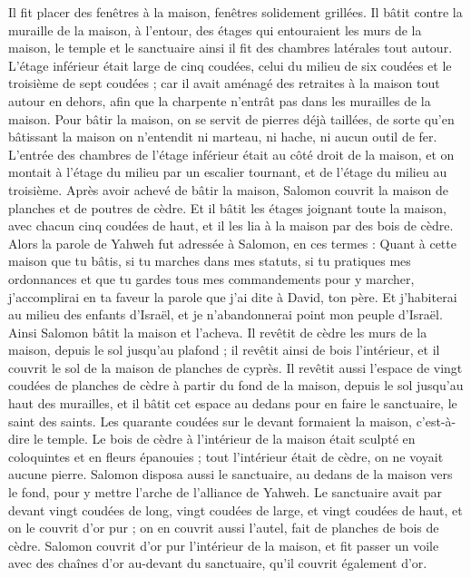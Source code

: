\begin{multicols}{2}
Il fit placer des fenêtres à la maison, fenêtres solidement grillées.
Il bâtit contre la muraille de la maison, à l’entour, des étages qui entouraient les murs de la maison, le temple et le sanctuaire ainsi il fit des chambres latérales tout autour.
L’étage inférieur était large de cinq coudées, celui du milieu de six coudées et le troisième de sept coudées ; car il avait aménagé des retraites à la maison tout autour en dehors, afin que la charpente n'entrât pas dans les murailles de la maison.
Pour bâtir la maison, on se servit de pierres déjà taillées, de sorte qu'en bâtissant la maison on n'entendit ni marteau, ni hache, ni aucun outil de fer.
L'entrée des chambres de l’étage inférieur était au côté droit de la maison, et on montait à l’étage du milieu par un escalier tournant, et de l’étage du milieu au troisième.
Après avoir achevé de bâtir la maison, Salomon couvrit la maison de planches et de poutres de cèdre.
Et il bâtit les étages joignant toute la maison, avec chacun cinq coudées de haut, et il les lia à la maison par des bois de cèdre.
Alors la parole de Yahweh fut adressée à Salomon, en ces termes :
Quant à cette maison que tu bâtis, si tu marches dans mes statuts, si tu pratiques mes ordonnances et que tu gardes tous mes commandements pour y marcher, j’accomplirai en ta faveur la parole que j'ai dite à David, ton père.
Et j'habiterai au milieu des enfants d'Israël, et je n'abandonnerai point mon peuple d'Israël.
Ainsi Salomon bâtit la maison et l'acheva.
Il revêtit de cèdre les murs de la maison, depuis le sol jusqu'au plafond ; il revêtit ainsi de bois l’intérieur, et il couvrit le sol de la maison de planches de cyprès.
Il revêtit aussi l'espace de vingt coudées de planches de cèdre à partir du fond de la maison, depuis le sol jusqu'au haut des murailles, et il bâtit cet espace au dedans pour en faire le sanctuaire, le saint des saints.
Les quarante coudées sur le devant formaient la maison, c’est-à-dire le temple.
Le bois de cèdre à l’intérieur de la maison était sculpté en coloquintes et en fleurs épanouies ; tout l’intérieur était de cèdre, on ne voyait aucune pierre.
Salomon disposa aussi le sanctuaire, au dedans de la maison vers le fond, pour y mettre l'arche de l'alliance de Yahweh.
Le sanctuaire avait par devant vingt coudées de long, vingt coudées de large, et vingt coudées de haut, et on le couvrit d’or pur ; on en couvrit aussi l'autel, fait de planches de bois de cèdre.
Salomon couvrit d’or pur l’intérieur de la maison, et fit passer un voile avec des chaînes d'or au-devant du sanctuaire, qu’il couvrit également d'or.

\end{multicols}

